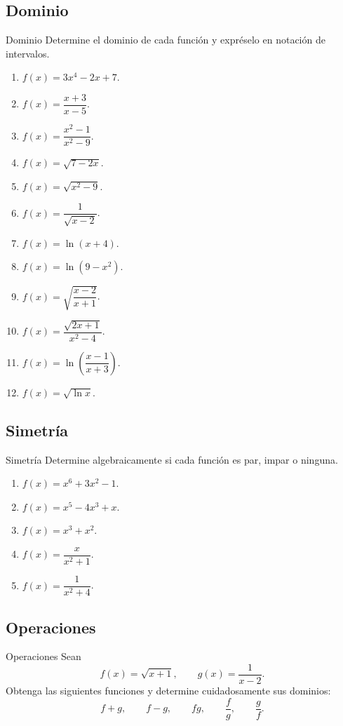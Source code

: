 \documentclass[aspectratio=169,10pt]{beamer}
\begin{document}
\subsection*{Dominio}
\begin{frame}{Dominio}
Determine el dominio de cada función y expréselo en notación de intervalos.

\begin{enumerate}
    \item $f(x)=3x^4-2x+7$.
    \item $f(x)=\dfrac{x+3}{x-5}$.
    \item $f(x)=\dfrac{x^2-1}{x^2-9}$.
    \item $f(x)=\sqrt{7-2x}$.
    \item $f(x)=\sqrt{x^2-9}$.
    \item $f(x)=\dfrac{1}{\sqrt{x-2}}$.
    \item $f(x)=\ln(x+4)$.
    \item $f(x)=\ln(9-x^2)$.
    \item $f(x)=\sqrt{\dfrac{x-2}{x+1}}$.
    \item $f(x)=\dfrac{\sqrt{2x+1}}{x^2-4}$.
    \item $f(x)=\ln\left(\dfrac{x-1}{x+3}\right)$.
    \item $f(x)=\sqrt{\ln x}$.
\end{enumerate}
\end{frame}
\subsection*{Simetría}
\begin{frame}{Simetría}
Determine algebraicamente si cada función es par, impar o ninguna.

\begin{enumerate}
    \item $f(x)=x^6+3x^2-1$.
    \item $f(x)=x^5-4x^3+x$.
    \item $f(x)=x^3+x^2$.
    \item $f(x)=\dfrac{x}{x^2+1}$.
    \item $f(x)=\dfrac{1}{x^2+4}$.
\end{enumerate}
\end{frame}
\subsection*{Operaciones}
\begin{frame}{Operaciones}
Sean
\[
f(x)=\sqrt{x+1},
\qquad
g(x)=\frac{1}{x-2}.
\]
Obtenga las siguientes funciones y determine cuidadosamente sus dominios:
\[
f+g,\qquad f-g,\qquad fg,\qquad\frac fg,\qquad\frac gf.
\]
\end{frame}
\end{document}
